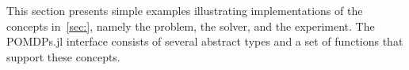 This section presents simple examples illustrating implementations of the concepts in~\cref{sec:}, namely the problem, the solver, and the experiment. 
The POMDPs.jl interface consists of several abstract types and a set of functions that support these concepts. 

% 
% 
% 
% 
% 
% 
